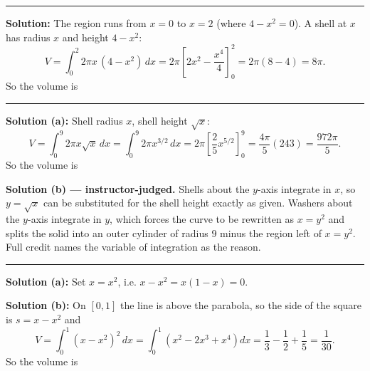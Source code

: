 \documentclass[12pt]{article}
\begin{document}
\vspace{0.2cm}\noindent\rule{\linewidth}{0.2pt}\vspace{0.2cm}


\textbf{Solution:} The region runs from $x = 0$ to $x = 2$ (where $4 - x^2 = 0$). A shell at $x$ has radius $x$ and height $4 - x^2$:
\[ V = \int_0^2 2\pi x\,(4 - x^2)\,dx = 2\pi\left[2x^2 - \frac{x^4}{4}\right]_0^2 = 2\pi(8 - 4) = 8\pi. \]
So the volume is 

\vspace{0.2cm}\noindent\rule{\linewidth}{0.2pt}\vspace{0.2cm}


\textbf{Solution (a):} Shell radius $x$, shell height $\sqrt{x}$:
\[ V = \int_0^9 2\pi x\sqrt{x}\,dx = \int_0^9 2\pi x^{3/2}\,dx = 2\pi\left[\frac{2}{5}x^{5/2}\right]_0^9 = \frac{4\pi}{5}(243) = \frac{972\pi}{5}. \]
So the volume is 

\textbf{Solution (b) --- instructor-judged.} Shells about the $y$-axis integrate in $x$, so $y = \sqrt{x}$ can be substituted for the shell height exactly as given. Washers about the $y$-axis integrate in $y$, which forces the curve to be rewritten as $x = y^2$ and splits the solid into an outer cylinder of radius $9$ minus the region left of $x = y^2$. Full credit names the variable of integration as the reason.

\vspace{0.2cm}\noindent\rule{\linewidth}{0.2pt}\vspace{0.2cm}


\textbf{Solution (a):} Set $x = x^2$, i.e. $x - x^2 = x(1 - x) = 0$. 

\textbf{Solution (b):} On $[0,1]$ the line is above the parabola, so the side of the square is $s = x - x^2$ and
\[ V = \int_0^1 (x - x^2)^2\,dx = \int_0^1 \left(x^2 - 2x^3 + x^4\right)dx = \frac{1}{3} - \frac{1}{2} + \frac{1}{5} = \frac{1}{30}. \]
So the volume is 
\end{document}
